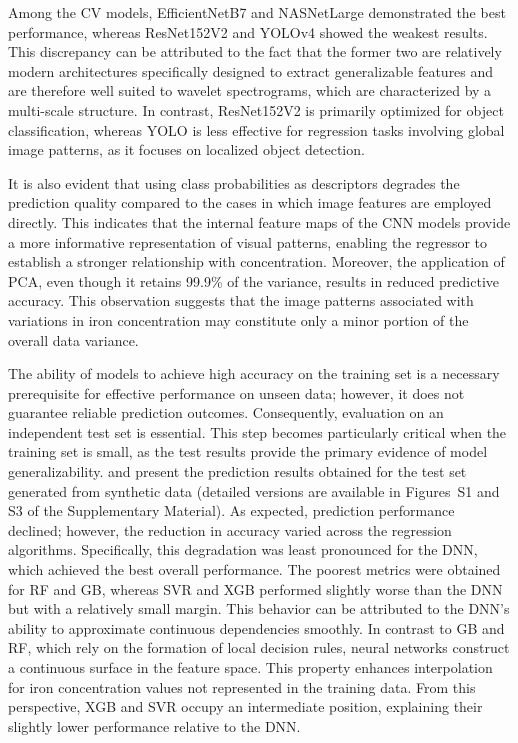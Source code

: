 \documentclass[10pt]{iopart}
\begin{document}
Among the CV models, EfficientNetB7 and NASNetLarge demonstrated the best performance,
whereas ResNet152V2 and YOLOv4 showed the weakest results.
This discrepancy can be attributed to the fact that the former two are relatively modern architectures
specifically designed to extract generalizable features and are therefore well suited to wavelet spectrograms,
which are characterized by a multi-scale structure.
In contrast, ResNet152V2 is primarily optimized for object classification, whereas YOLO is less effective for regression
tasks involving global image patterns, as it focuses on localized object detection.

It is also evident that using class probabilities as descriptors degrades the prediction quality
compared to the cases in which image features are employed directly.
This indicates that the internal feature maps of the CNN models provide a more informative representation of visual patterns,
enabling the regressor to establish a stronger relationship with concentration.
Moreover, the application of PCA, even though it retains 99.9\% of the variance, results in reduced predictive accuracy.
This observation suggests that the image patterns associated with variations in iron concentration may constitute
only a minor portion of the overall data variance.

The ability of models to achieve high accuracy on the training set is a necessary prerequisite for effective performance on unseen data;
however, it does not guarantee reliable prediction outcomes.
Consequently, evaluation on an independent test set is essential.
This step becomes particularly critical when the training set is small, as the test results provide the primary evidence of model generalizability.
 and  present the prediction results obtained for the test set generated from synthetic data
(detailed versions are available in Figures~S1 and S3 of the Supplementary Material).
As expected, prediction performance declined; however, the reduction in accuracy varied across the regression algorithms.
Specifically, this degradation was least pronounced for the DNN, which achieved the best overall performance.
The poorest metrics were obtained for RF and GB, whereas SVR and XGB performed slightly worse than the DNN but with a relatively small margin.
This behavior can be attributed to the DNN’s ability to approximate continuous dependencies smoothly.
In contrast to GB and RF, which rely on the formation of local decision rules,
neural networks construct a continuous surface in the feature space.
This property enhances interpolation for iron concentration values not represented in the training data.
From this perspective, XGB and SVR occupy an intermediate position, explaining their slightly lower performance relative to the DNN.
\end{document}
